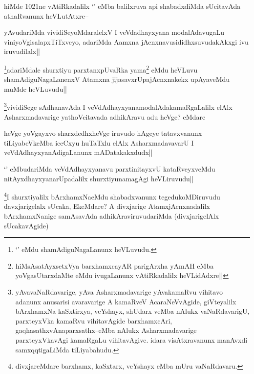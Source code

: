 \begin{artha}
hiMde 1021ne vAtiRkadalilx `\stext' eMba balilxruva api shabadxdiMda sUcitavAda athaRvanunx heVLutAtxre--
\end{artha}

\begin{artha}
yAvudariMda vividiSeyoMdaralelxV I veVdadhayxyana modalAdavugaLu viniyoVgisalapxTiTxveyo, adariMda Aamxna jAcnxnavusididhxsuvudakAkxgi ivu iruvudilalx||
\end{artha}

\begin{artha}
\footnote{`\stext' eMdu shamAdiguNagaLanunx heVLuvudu.}adariMdale shurxtiyu parxtanxpUvaRka yama\footnote{hiMsAsatAyxsetxVya barxhamxcayAR parigArxha yAmAH eMba yoVgasUtarxdaMte eMdu ivugaLanunx vAtiRkadalilx heVLidAdxre||} eMdu heVLuvu shamAdiguNagaLanenxV Atamxna jijasavxrUpajAcnxnakekx upAyaveMdu muMde heVLuvudu||
\end{artha}


\begin{artha}
\footnote{yAvavaNaRdavarige, yAva Asharxmadavarige yAvakamaRvu vihitavo adanunx anusarisi avaravarige A kamaRveV AcaraNeVvAgide, giVteyalilx bArxhamxNa kaSxtirxya, veYshayx, shUdarx veMba nAlukx vaNaRdavarigU, parxteyxVka kamaRvu vihitavAgide barxhamxcAri, gaqhasathxvAnaparxsathx--eMba nAlukx Asharxmadavarige parxteyxVkavAgi kamaRgaLu vihitavAgive. idara visAtxravanunx manAvxdi samxqqtigaLiMda tiLiyabahudu.}vividiSege sAdhanavAda I veVdAdhayxyanamodalAdakamaRgaLalilx elAlx Asharxmadavarige yathoVcitavada adhikAravu adu heVge? eMdare
\end{artha}

\begin{artha}
heVge yoVgayxvo sharxdedhxheVge iruvudo hAgeye tatavxvanunx tiLiyabeVkeMba iceCxyu huTaTxlu elAlx AsharxmadavavarU I veVdAdhayxyanAdigaLanunx mADatakakxdudx||
\end{artha}


\begin{artha}
`\stext' eMbudariMda veVdAdhayxyanavu parxtinitayxvU kataRveyxveMdu nitAyxdhayxyanarUpadalilx shurxtiyunamagAgi heVLiruvudu||
\end{artha}

\begin{artha}
\footnote{divxjareMdare barxhamx, kaSxtarx, veYshayx eMba mUru vaNaRdavaru.}I shurxtiyalilx bArxhamxNaeMdu shabadxvanunx tegedukoMDiruvudu davxjarigelalx sUcaka, EkeMdare? A divxjarige AtamxjAcnxnadalilx bArxhamxNanige samAsavAda adhikAraviruvudariMda (divxjarigelAlx sUcakavAgide)
\end{artha}

